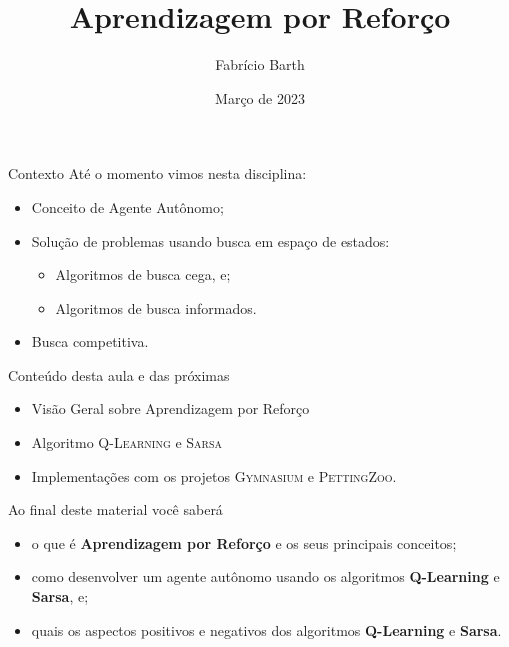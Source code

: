 \documentclass{beamer}
\begin{document}
\title{Aprendizagem por Reforço} 
\author{Fabrício Barth}
\date{Março de 2023}

\maketitle

\begin{frame}{Contexto}
Até o momento vimos nesta disciplina:
\begin{itemize}
	\item Conceito de Agente Autônomo;
	\item Solução de problemas usando busca em espaço de estados:
	\begin{itemize}
		\item Algoritmos de busca cega, e;
		\item Algoritmos de busca informados.
	\end{itemize}
	\item Busca competitiva.
\end{itemize}
\end{frame}

\begin{frame}{Conteúdo desta aula e das próximas}
  \begin{itemize}
\item Visão Geral sobre Aprendizagem por Reforço
\item Algoritmo \textsc{Q-Learning} e \textsc{Sarsa}
\item Implementações com os projetos \textsc{Gymnasium} e \textsc{PettingZoo}.
  \end{itemize}
\end{frame}

\begin{frame}{Ao final deste material você saberá}

	\begin{itemize}
	\item o que é \textbf{Aprendizagem por Reforço} e os seus principais conceitos;
	\item como desenvolver um agente autônomo usando os algoritmos \textbf{Q-Learning} e \textbf{Sarsa}, e;
	\item quais os aspectos positivos e negativos dos algoritmos \textbf{Q-Learning} e \textbf{Sarsa}.
	\end{itemize}

\end{frame}
\end{document}
